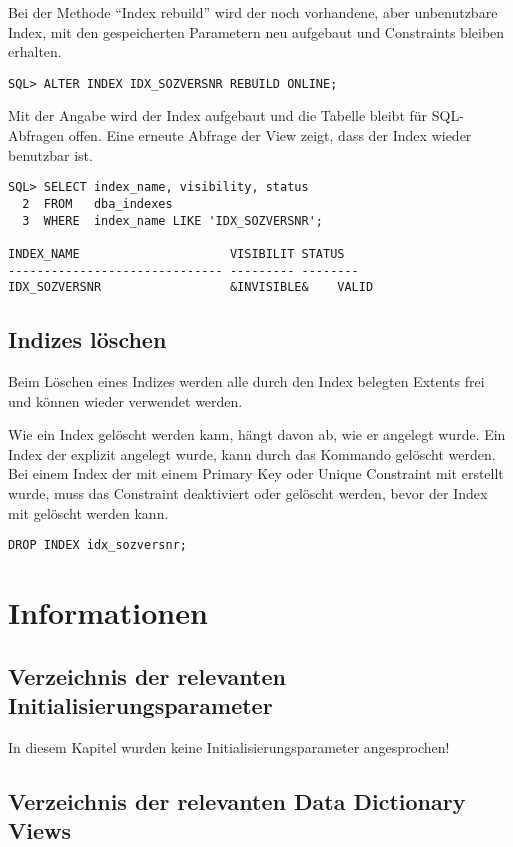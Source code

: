           Bei der Methode \enquote{Index rebuild} wird der noch vorhandene, aber unbenutzbare Index, mit den gespeicherten Parametern neu aufgebaut und Constraints bleiben erhalten.
          \begin{lstlisting}[caption={Einen Index reparieren},label=admin331,language=oracle_sql]
SQL> ALTER INDEX IDX_SOZVERSNR REBUILD ONLINE;
          \end{lstlisting}
          Mit der Angabe  wird der Index aufgebaut und die Tabelle bleibt f\"ur SQL-Abfragen offen. Eine erneute Abfrage der View  zeigt, dass der Index wieder benutzbar ist.
          \begin{lstlisting}[caption={Der Index ist wieder benutzbar},label=admin332,language=oracle_sql]
SQL> SELECT index_name, visibility, status
  2  FROM   dba_indexes
  3  WHERE  index_name LIKE 'IDX_SOZVERSNR';

INDEX_NAME                     VISIBILIT STATUS
------------------------------ --------- --------
IDX_SOZVERSNR                  &INVISIBLE&    VALID
          \end{lstlisting}
      \subsection{Indizes l\"oschen}
        Beim L\"oschen eines Indizes werden alle durch den Index belegten Extents frei und k\"onnen wieder verwendet werden.
				
        Wie ein Index gel\"oscht werden kann, h\"angt davon ab, wie er angelegt wurde. Ein Index der explizit angelegt wurde, kann durch das Kommando  gel\"oscht werden. Bei einem Index der mit einem Primary Key oder Unique Constraint mit erstellt wurde, muss das Constraint deaktiviert oder gel\"oscht werden, bevor der Index mit  gel\"oscht werden kann.
        \begin{lstlisting}[caption={Einen Index L\"oschen},label=admin333,language=oracle_sql]
DROP INDEX idx_sozversnr;
        \end{lstlisting}
    \section{Informationen}
      \subsection{Verzeichnis der relevanten Initialisierungsparameter}
        In diesem Kapitel wurden keine Initialisierungsparameter angesprochen!
      \subsection{Verzeichnis der relevanten Data Dictionary Views}
        \begin{literaturinternet}
          \item \cite{sthref2545}
          \item \cite{sthref2528}
          \item \cite{sthref2202}
          \item \cite{sthref2191}
        \end{literaturinternet}
\clearpage
